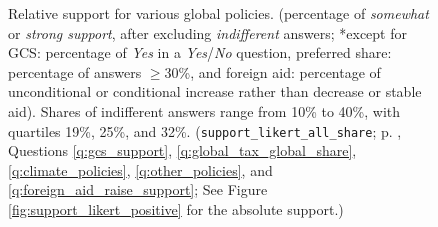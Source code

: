 \documentclass[12pt,english]{article}
\begin{document}
\begin{bibunit}
\begin{figure}[h!]
    \cprotect\caption[Relative support for other global policies]{Relative support for various global policies. (percentage of \textit{somewhat} or \textit{strong support}, after excluding \textit{indifferent} answers; *except for GCS: percentage of \textit{Yes} in a \textit{Yes}/\textit{No} question, preferred share: percentage of answers $\geq$30\%, and foreign aid: percentage of unconditional or conditional increase rather than decrease or stable aid). Shares of indifferent answers range from 10\% to 40\%, with quartiles 19\%, 25\%, and 32\%. (\verb|support_likert_all_share|; p. \pageref{subsec:questionnaire_GCS}, Questions \ref{q:gcs_support}, \ref{q:global_tax_global_share}, \ref{q:climate_policies}, \ref{q:other_policies}, and \ref{q:foreign_aid_raise_support}; See Figure \ref{fig:support_likert_positive} for the absolute support.)%
    }
    \label{fig:support}
\end{figure} 

\renewcommand{\thetable}{ED\arabic{table}}
\renewcommand{\thefigure}{ED\arabic{figure}}
\setcounter{figure}{0}
\setcounter{table}{0}



\end{bibunit}
\end{document}
